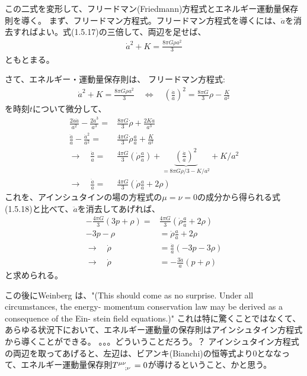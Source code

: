 \documentclass[11pt]{ltjsarticle}
\theoremstyle{plain}
\theoremstyle{break}
\begin{document}
この二式を変形して、フリードマン(Friedmann)方程式とエネルギー運動量保存則を導く。
まず、フリードマン方程式。フリードマン方程式を導くには、$\ddot{a}$を消去すればよい。式(1.5.17)の三倍して、両辺を足せば、
\begin{align}
  \dot{a}^{2}+K=\frac{8 \pi G \rho a^{2}}{3} \label{eq:1.5.19-friedmann}
\end{align}%
ともとまる。

さて、エネルギー・運動量保存則は、
フリードマン方程式:
\begin{align}
  \dot{a}^{2}+K=\frac{8 \pi G \rho a^{2}}{3}  \quad \Leftrightarrow \quad \left(\frac{\dot{a}}{a} \right)^2 = \frac{8\pi G}{3} \rho - \frac{K}{a^2}
\end{align}%
を時刻$t$について微分して、
\begin{align}
\frac{2 \dot{a} \ddot{a}}{a^2} - \frac{2 \dot{a}^3 }{a^3 } =&\frac{8 \pi G}{3} \dot{\rho} + \frac{2K \dot{a}}{a^3} \\
\frac{\ddot{a}}{a} - \frac{\dot{a}^2}{a^2} =& \frac{4  \pi G}{3} \dot{\rho} \frac{a}{\dot{a}} + \frac{K}{a^2}\\
\rightarrow \quad \frac{\ddot{a}}{a} =& \frac{4 \pi G}{3}(\dot{\rho} \frac{a}{\dot{a}}) + \underbrace{(\frac{\dot{a}}{a})^2}_{=
8\pi G \rho /3 - {K}/{a^2} } +{K}/{a^2}  \\
\rightarrow \quad \frac{\ddot{a}}{a} =& \frac{4 \pi G}{3} ( \dot{\rho} \frac{a}{\dot{a}} + 2 \rho)
\end{align}%
これを、アインシュタインの場の方程式の$\mu = \nu = 0$の成分から得られる式(1.5.18)と比べて、$\ddot{a}$を消去してあげれば、
\begin{align}
 - \frac{4 \pi G}{3}  ( 3 p + \rho)  = & \frac{4 \pi G}{3} ( \dot{\rho} \frac{a}{\dot{a}} + 2 \rho) \\
 -3p - \rho &= \dot{\rho} \frac{a}{\dot{a}} + 2\rho \\
 \rightarrow \quad \dot{\rho} &= \frac{\dot{a}}{a}(-3p -3\rho) \\
 \rightarrow \quad \dot{\rho} &= -\frac{3\dot{a}}{a}(p + \rho)
\end{align}%
と求められる。

この後にWeinberg は、"(This should come as no surprise. Under all circumstances, the energy- momentum conservation law may be derived as a consequence of the Ein- stein field equations.)"
これは特に驚くことではなくて、あらゆる状況下において、エネルギー運動量の保存則はアインシュタイン方程式から導くことができる。
。。。どういうことだろう。？
アインシュタイン方程式の両辺を取ってあげると、左辺は、ビアンキ(Bianchi)の恒等式より0とななって、エネルギー運動量保存則$\tensor{T}{^{\mu \nu}_{;\nu}} =0$が導けるということ、かと思う。
\end{document}
